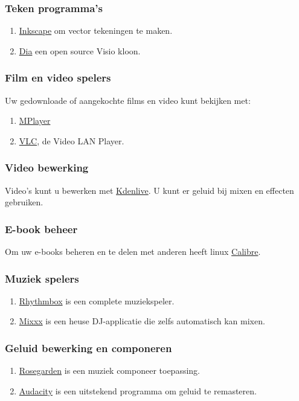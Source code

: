 \subsubsection{Teken programma's}

\begin{enumerate}
	\item \href{https://inkscape.org/nl/}{Inkscape} om vector tekeningen te maken.
	\item \href{https://wiki.gnome.org/Apps/Dia}{Dia} een open source Visio kloon. 
\end{enumerate}

\subsubsection{Film en video spelers}
Uw gedownloade of aangekochte films en video kunt bekijken met:
\begin{enumerate}
	\item \href{http://www.mplayer.org/}{MPlayer}
	\item \href{http://www.videolan.org/vlc/}{VLC}, de Video LAN Player.
\end{enumerate}

\subsubsection{Video bewerking}
Video's kunt u bewerken met \href{https://kdenlive.org/}{Kdenlive}. U kunt er geluid bij mixen en effecten gebruiken.

\subsubsection{E-book beheer}
Om uw e-books beheren en te delen met anderen heeft linux \href{http://calibre-ebook.com/}{Calibre}.

\subsubsection{Muziek spelers}
\begin{enumerate}
	\item \href{https://wiki.gnome.org/Apps/Rhythmbox}{Rhythmbox} is een complete muziekspeler.
	\item \href{http://mixxx.org/}{Mixxx} is een heuse DJ-applicatie die zelfs automatisch kan mixen.
\end{enumerate}

\subsubsection{Geluid bewerking en componeren}
\begin{enumerate}
	\item \href{http://www.rosegardenmusic.com/}{Rosegarden} is een muziek componeer toepassing.
	\item \href{http://audacity.sourceforge.net/}{Audacity} is een uitstekend programma om geluid te remasteren.
\end{enumerate}


